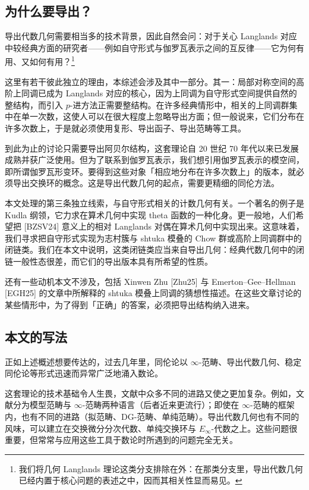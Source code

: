 \subsection{为什么要导出？}

导出代数几何需要相当多的技术背景，因此自然会问：对于关心 Langlands 对应中较经典方面的研究者——例如自守形式与伽罗瓦表示之间的互反律——它为何有用、又如何有用？\footnote{我们将几何 Langlands 理论这类分支排除在外：在那类分支里，导出代数几何已经内置于核心问题的表述之中，因而其相关性显而易见。}

这里有若干彼此独立的理由，本综述会涉及其中一部分。其一：局部对称空间的高阶上同调已成为 Langlands 对应的核心，因为上同调为自守形式空间提供自然的整结构，而引入 $p$-进方法正需要整结构。在许多经典情形中，相关的上同调群集中在单一次数，这使人可以在很大程度上忽略导出方面；但一般说来，它们分布在许多次数上，于是就必须使用复形、导出函子、导出范畴等工具。

到此为止的讨论只需要导出阿贝尔结构，这套理论自 20 世纪 70 年代以来已发展成熟并获广泛使用。但为了联系到伽罗瓦表示，我们想引用伽罗瓦表示的模空间，即所谓伽罗瓦形变环。要得到这些对象「相应地分布在许多次数上」的版本，就必须导出交换环的概念。这是导出代数几何的起点，需要更精细的同伦方法。

本文处理的第三条独立线索，与自守形式相关的计数几何有关。一个著名的例子是 Kudla 纲领，它力求在算术几何中实现 theta 函数的一种化身。更一般地，人们希望把 [BZSV24] 意义上的相对 Langlands 对偶在算术几何中实现出来。这意味着，我们寻求把自守形式实现为志村簇与 shtuka 模叠的 Chow 群或高阶上同调群中的闭链类。我们在本文中说明，这类闭链类应当来自导出几何：经典代数几何中的闭链一般性态很差，而它们的导出版本具有所希望的性质。

还有一些动机本文不涉及，包括 Xinwen Zhu [Zhu25] 与 Emerton--Gee--Hellman [EGH25] 的文章中所解释的 shtuka 模叠上同调的猜想性描述。在这些文章讨论的某些情形中，为了得到「正确」的答案，必须把导出结构纳入进来。

\subsection{本文的写法}

正如上述概述想要传达的，过去几年里，同伦论以 $\infty$-范畴、导出代数几何、稳定同伦论等形式迅速而异常广泛地涌入数论。

这套理论的技术基础令人生畏，文献中众多不同的进路又使之更加复杂。例如，文献分为模型范畴与 $\infty$-范畴两种语言（后者近来更流行）；即使在 $\infty$-范畴的框架内，也有不同的进路（拟范畴、DG-范畴、单纯范畴）。导出代数几何也有不同的风味，可以建立在交换微分分次代数、单纯交换环与 $E_\infty$-代数之上。这些问题很重要，但常常与应用这些工具于数论时所遇到的问题完全无关。

